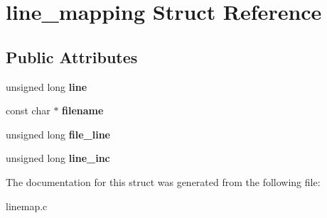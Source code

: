 \hypertarget{structline__mapping}{\section{line\-\_\-mapping Struct Reference}
\label{structline__mapping}
}
\subsection*{Public Attributes}
\begin{DoxyCompactItemize}
\item 
\hypertarget{structline__mapping_a7c952093a673788a042f10f6201a270d}{unsigned long {\bfseries line}}\label{structline__mapping_a7c952093a673788a042f10f6201a270d}

\item 
\hypertarget{structline__mapping_adb92b96e49b8d87e2531499ab5e2ee88}{const char $\ast$ {\bfseries filename}}\label{structline__mapping_adb92b96e49b8d87e2531499ab5e2ee88}

\item 
\hypertarget{structline__mapping_a1cfb7d5dd5dca22d058c98f83aba7d90}{unsigned long {\bfseries file\-\_\-line}}\label{structline__mapping_a1cfb7d5dd5dca22d058c98f83aba7d90}

\item 
\hypertarget{structline__mapping_af182239c6ca32283b73932e19d2a6d71}{unsigned long {\bfseries line\-\_\-inc}}\label{structline__mapping_af182239c6ca32283b73932e19d2a6d71}

\end{DoxyCompactItemize}


The documentation for this struct was generated from the following file\-:\begin{DoxyCompactItemize}
\item 
linemap.\-c\end{DoxyCompactItemize}
